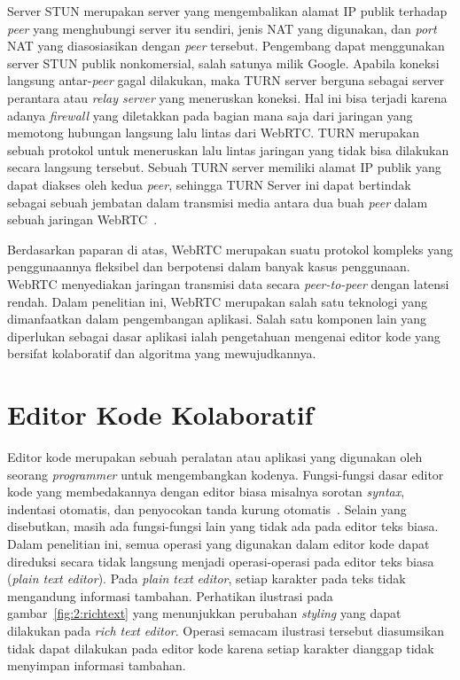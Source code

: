 Server STUN merupakan server yang mengembalikan alamat IP publik terhadap \textit{peer} yang menghubungi server itu sendiri, jenis NAT yang digunakan, dan \textit{port} NAT yang diasosiasikan dengan \textit{peer} tersebut. Pengembang dapat menggunakan server STUN publik nonkomersial, salah satunya milik Google. Apabila koneksi langsung antar-\textit{peer} gagal dilakukan, maka TURN server berguna sebagai server perantara atau \textit{relay server} yang meneruskan koneksi. Hal ini bisa terjadi karena adanya \textit{firewall} yang diletakkan pada bagian mana saja dari jaringan yang memotong hubungan langsung lalu lintas dari WebRTC. TURN merupakan sebuah protokol untuk meneruskan lalu lintas jaringan yang tidak bisa dilakukan secara langsung tersebut. Sebuah TURN server memiliki alamat IP publik yang dapat diakses oleh kedua \textit{peer}, sehingga TURN Server ini dapat bertindak sebagai sebuah jembatan dalam transmisi media antara dua buah \textit{peer} dalam sebuah jaringan WebRTC~\citep{rfc5766}.

Berdasarkan paparan di atas, WebRTC merupakan suatu protokol kompleks yang penggunaannya fleksibel dan berpotensi dalam banyak kasus penggunaan. WebRTC menyediakan jaringan transmisi data secara \textit{peer-to-peer} dengan latensi rendah. Dalam penelitian ini, WebRTC merupakan salah satu teknologi yang dimanfaatkan dalam pengembangan aplikasi. Salah satu komponen lain yang diperlukan sebagai dasar aplikasi ialah pengetahuan mengenai editor kode yang bersifat kolaboratif dan algoritma yang mewujudkannya.

\section{Editor Kode Kolaboratif}

Editor kode merupakan sebuah peralatan atau aplikasi yang digunakan oleh seorang \textit{programmer} untuk mengembangkan kodenya. Fungsi-fungsi dasar editor kode yang membedakannya dengan editor biasa misalnya sorotan \textit{syntax}, indentasi otomatis, dan penyocokan tanda kurung otomatis~\citep{kinder2013sublime, intellij2011most}. Selain yang disebutkan, masih ada fungsi-fungsi lain yang tidak ada pada editor teks biasa. Dalam penelitian ini, semua operasi yang digunakan dalam editor kode dapat direduksi secara tidak langsung menjadi operasi-operasi pada editor teks biasa (\textit{plain text editor}). Pada \textit{plain text editor}, setiap karakter pada teks tidak mengandung informasi tambahan. Perhatikan ilustrasi pada gambar~\ref{fig:2:richtext} yang menunjukkan perubahan \textit{styling} yang dapat dilakukan pada \textit{rich text editor}. Operasi semacam ilustrasi tersebut diasumsikan tidak dapat dilakukan pada editor kode karena setiap karakter dianggap tidak menyimpan informasi tambahan.

